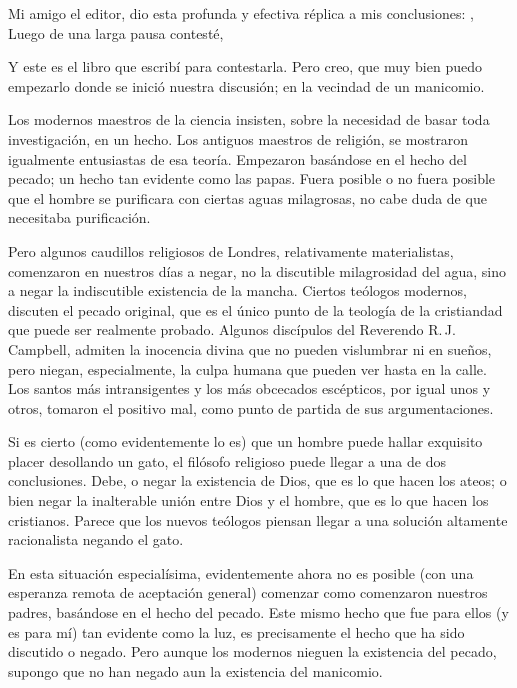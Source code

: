 Mi amigo el editor, dio esta profunda y efectiva réplica a mis conclusiones: , Luego de una larga pausa contesté, 

Y este es el libro que escribí para contestarla.
Pero creo, que muy bien puedo empezarlo donde se inició nuestra discusión; en la vecindad de un
manicomio.

Los modernos maestros de la ciencia insisten, sobre la necesidad de basar toda investigación, en un
hecho. Los antiguos maestros de religión, se mostraron igualmente entusiastas de esa teoría. Empezaron
basándose en el hecho del pecado; un hecho tan evidente como las papas. Fuera posible o no fuera posible
que el hombre se purificara con ciertas aguas milagrosas, no cabe duda de que necesitaba purificación.

Pero algunos caudillos religiosos de Londres, relativamente materialistas, comenzaron en nuestros días a
negar, no la discutible milagrosidad del agua, sino a negar la indiscutible existencia de la mancha. Ciertos
teólogos modernos, discuten el pecado original, que es el único punto de la teología de la cristiandad que
puede ser realmente probado. Algunos discípulos del Reverendo R.\,J. Campbell, admiten la inocencia
divina que no pueden vislumbrar ni en sueños, pero niegan, especialmente, la culpa humana que pueden
ver hasta en la calle. Los santos más intransigentes y los más obcecados escépticos, por igual unos y
otros, tomaron el positivo mal, como punto de partida de sus argumentaciones.

Si es cierto (como evidentemente lo es) que un hombre puede hallar exquisito placer desollando un
gato, el filósofo religioso puede llegar a una de dos conclusiones. Debe, o negar la existencia de Dios, que
es lo que hacen los ateos; o bien negar la inalterable unión entre Dios y el hombre, que es lo que hacen los
cristianos. Parece que los nuevos teólogos piensan llegar a una solución altamente racionalista negando el
gato.

En esta situación especialísima, evidentemente ahora no es posible (con una esperanza remota de
aceptación general) comenzar como comenzaron nuestros padres, basándose en el hecho del pecado. Este
mismo hecho que fue para ellos (y es para mí) tan evidente como la luz, es precisamente el hecho que ha
sido discutido o negado. Pero aunque los modernos nieguen la existencia del pecado, supongo que no han
negado aun la existencia del manicomio.

